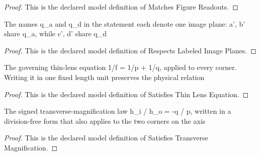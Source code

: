 \begin{proof}
  This is the declared model definition of Matches Figure Readouts.
\end{proof}
\begin{definition}
  \label{def:physics:phyx-mini-0027:phyxminiproblems-problemphyxmini0027-respectslabeledimageplanes}
  The names q\_a and q\_d in the statement each denote one image plane: a', b' share q\_a, while c', d' share q\_d
\end{definition}
\begin{proof}
  This is the declared model definition of Respects Labeled Image Planes.
\end{proof}
\begin{definition}
  \label{def:physics:phyx-mini-0027:phyxminiproblems-problemphyxmini0027-satisfiesthinlensequation}
  The governing thin-lens equation 1/f = 1/p + 1/q, applied to every corner. Writing it in one fixed length unit preserves the physical relation
\end{definition}
\begin{proof}
  This is the declared model definition of Satisfies Thin Lens Equation.
\end{proof}
\begin{definition}
  \label{def:physics:phyx-mini-0027:phyxminiproblems-problemphyxmini0027-satisfiestransversemagnification}
  The signed transverse-magnification law h\_i / h\_o = -q / p, written in a division-free form that also applies to the two corners on the axis
\end{definition}
\begin{proof}
  This is the declared model definition of Satisfies Transverse Magnification.
\end{proof}
